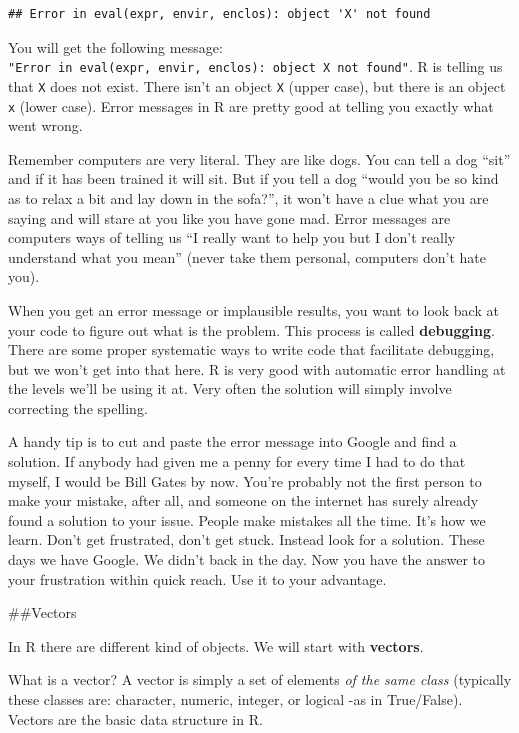 \documentclass[
]{book}
\begin{document}
\begin{verbatim}
## Error in eval(expr, envir, enclos): object 'X' not found
\end{verbatim}

You will get the following message: \texttt{"Error\ in\ eval(expr,\ envir,\ enclos):\ object\ \textquotesingle{}X\textquotesingle{}\ not\ found"}. R is telling us that \texttt{X} does not exist. There isn't an object \texttt{X} (upper case), but there is an object \texttt{x} (lower case). Error messages in R are pretty good at telling you exactly what went wrong.

Remember computers are very literal. They are like dogs. You can tell a dog ``sit'' and if it has been trained it will sit. But if you tell a dog ``would you be so kind as to relax a bit and lay down in the sofa?'', it won't have a clue what you are saying and will stare at you like you have gone mad. Error messages are computers ways of telling us ``I really want to help you but I don't really understand what you mean'' (never take them personal, computers don't hate you).

When you get an error message or implausible results, you want to look back at your code to figure out what is the problem. This process is called \textbf{debugging}. There are some proper systematic ways to write code that facilitate debugging, but we won't get into that here. R is very good with automatic error handling at the levels we'll be using it at. Very often the solution will simply involve correcting the spelling.

A handy tip is to cut and paste the error message into Google and find a solution. If anybody had given me a penny for every time I had to do that myself, I would be Bill Gates by now. You're probably not the first person to make your mistake, after all, and someone on the internet has surely already found a solution to your issue. People make mistakes all the time. It's how we learn. Don't get frustrated, don't get stuck. Instead look for a solution. These days we have Google. We didn't back in the day. Now you have the answer to your frustration within quick reach. Use it to your advantage.

\#\#Vectors

In R there are different kind of objects. We will start with \textbf{vectors}.

What is a vector? A vector is simply a set of elements \emph{of the same class} (typically these classes are: character, numeric, integer, or logical -as in True/False). Vectors are the basic data structure in R.
\end{document}
